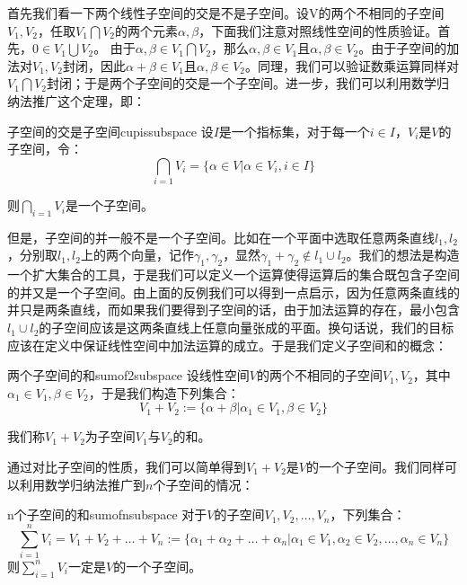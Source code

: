     首先我们看一下两个线性子空间的交是不是子空间。设V的两个不相同的子空间$V_1,V_2$，任取$V_1\bigcap V_2$的两个元素$\alpha,\beta$，下面我们注意对照线性空间的性质验证。首先，$0\in V_1\bigcup V_2。$ 由于$\alpha,\beta\in V_1\bigcap V_2$，那么$\alpha,\beta\in V_1\textrm{且}\alpha,\beta\in V_2$。由于子空间的加法对$V_1,V_2$封闭，因此$\alpha+\beta\in V_1\textrm{且}\alpha,\beta\in V_2$。同理，我们可以验证数乘运算同样对$V_1\bigcap V_2$封闭；于是两个子空间的交是一个子空间。进一步，我们可以利用数学归纳法推广这个定理，即：
    \begin{theorem}{子空间的交是子空间}{cupissubspace}
    设$I$是一个指标集，对于每一个$i\in I$，$V_i$是$V$的子空间，令：
    \begin{equation}
        \bigcap_{i=1}V_i=\{\alpha\in V|\alpha\in V_i,i\in I\}
    \end{equation}
    
    则$\bigcap_{i=1}V_i$是一个子空间。
    \end{theorem}
    
    但是，子空间的并一般不是一个子空间。比如在一个平面中选取任意两条直线$l_1,l_2$，分别取$l_1,l_2$上的两个向量，记作$\gamma_1,\gamma_2$，显然$\gamma_1+\gamma_2\notin l_1\cup l_2$。我们的想法是构造一个扩大集合的工具，于是我们可以定义一个运算使得运算后的集合既包含子空间的并又是一个子空间。由上面的反例我们可以得到一点启示，因为任意两条直线的并只是两条直线，而如果我们要得到子空间的话，由于加法运算的存在，最小包含$l_1\cup l_2$的子空间应该是这两条直线上任意向量张成的平面。换句话说，我们的目标应该在定义中保证线性空间中加法运算的成立。于是我们定义子空间和的概念：\begin{definition}{两个子空间的和}{sumof2subspace}
        设线性空间$V$的两个不相同的子空间$V_1,V_2$，其中$\alpha_1\in V_1,\beta\in V_2$，于是我们构造下列集合：
        \begin{equation}
            V_1+V_2 :=\{\alpha+\beta|\alpha_1\in V_1,\beta\in V_2\}
        \end{equation}
        
        我们称$V_1+V_2$为子空间$V_1\textrm{与}V_2$的和。
    \end{definition}
    
    通过对比子空间的性质，我们可以简单得到$V_1+V_2$是$V$的一个子空间。我们同样可以利用数学归纳法推广到$n$个子空间的情况：
    \begin{theorem}{n个子空间的和}{sumofnsubspace}
    对于$V$的子空间$V_1,V_2,\dots,V_n$，下列集合：
    \begin{equation}
        \sum_{i=1}^n V_i=V_1+V_2+\dots+V_n:=\{\alpha_1+\alpha_2+\dots+\alpha_n|\alpha_1\in V_1,\alpha_2\in V_2,\dots,\alpha_n\in V_n\}
    \end{equation}
    则$\sum_{i=1}^n V_i$一定是$V$的一个子空间。
    \end{theorem}
    

